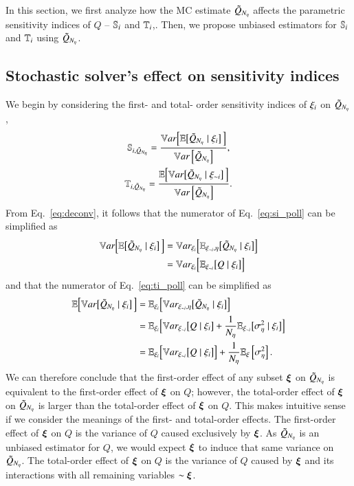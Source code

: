 In this section, we first analyze how the MC estimate $\Qpoll$ affects the parametric sensitivity indices of $Q$ -- $\S{i}$ and $\T{i}$,.
Then, we propose unbiased estimators for $\S{i}$ and $\T{i}$ using $\Qpoll$.

\subsection{Stochastic solver's effect on sensitivity indices}
We begin by considering the first- and total- order sensitivity indices of $\xii$ on $\Qpoll$,
\begin{gather}\label{eq:si_poll}
    \Spoll{i} = \frac{\VE{\Qpoll \mid \xii}}{\Var{\Qpoll}} , \\ \label{eq:ti_poll}
    \Tpoll{i} = \frac{\EV{\Qpoll \mid \xini}}{\Var{\Qpoll}} .
\end{gather}
From Eq.~\eqref{eq:deconv}, it follows that the numerator of Eq.~\eqref{eq:si_poll} can be simplified as
\begin{align} \nonumber
    \VE{\Qpoll \mid \xii} &= \Vsub{\xii}\Brac{ \E{\xini,\eta} \brac{\Qpoll \mid \xii} } \\ \label{eq:ve-deconv}
    &= \Vsub{\xii} \Brac{\E{\xini} \brac{Q \mid \xii}} 
\end{align}
and that the numerator of Eq.~\eqref{eq:ti_poll} can be simplified as
\begin{align} \nonumber
    \EV{\Qpoll \mid \xii} &= \E{\xii} \Brac{ \Vsub{\xini,\eta} \brac{\Qpoll \mid \xii} } \\ \nonumber
    &= \E{\xii} \Brac{\Vsub{\xini} \brac{Q\mid \xii} + \frac{1}{\Neta}\E{\xini} \brac{\Sigsqeta \mid \xii}} \\ \label{eq:ev-deconv}
    &= \E{\xii} \Brac{\Vsub{\xini} \brac{Q \mid \xii}} + \frac{1}{\Neta}\EExi{\Sigsqeta} .
\end{align}
%
We can therefore conclude that the first-order effect of any subset $\bxi$ on $\Qpoll$ is equivalent to the first-order effect of $\bxi$ on $Q$; 
however, the total-order effect of $\bxi$ on $\Qpoll$ is larger than the total-order effect of $\bxi$ on $Q$.
This makes intuitive sense if we consider the meanings of the first- and total-order effects. 
The first-order effect of $\bxi$ on $Q$ is the variance of $Q$ caused exclusively by $\bxi$. 
As $\Qpoll$ is an unbiased estimator for $Q$, we would expect $\bxi$ to induce that same variance on $\Qpoll$. 
The total-order effect of $\bxi$ on $Q$ is the variance of $Q$ caused by $\bxi$ and its interactions with all remaining variables $\sim \bxi$. 
